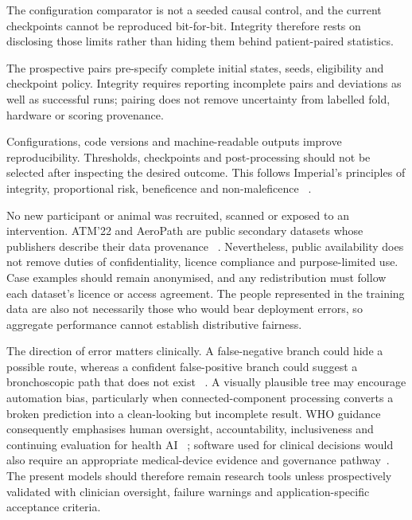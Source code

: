 \ifshowcurrentcontrol
\begin{currentcontrolroute}
The configuration comparator is not a seeded causal control, and the current checkpoints cannot
be reproduced bit-for-bit. Integrity therefore rests on disclosing those limits rather than
hiding them behind patient-paired statistics.
\end{currentcontrolroute}
\fi

\ifshowpairedcontrol
\begin{pairedcontrolroute}
The prospective pairs pre-specify complete initial states, seeds, eligibility and checkpoint
policy. Integrity requires reporting incomplete pairs and deviations as well as successful runs;
pairing does not remove uncertainty from labelled fold, hardware or scoring provenance.
\end{pairedcontrolroute}
\fi

Configurations, code versions and machine-readable outputs improve reproducibility. Thresholds,
checkpoints and post-processing should not be selected after inspecting the desired outcome. This
follows Imperial's principles of integrity, proportional risk, beneficence and non-maleficence
~\cite{imperial2025ethicalframework}.

No new participant or animal was recruited, scanned or exposed to an intervention. ATM'22 and
AeroPath are public secondary datasets whose publishers describe their data provenance
~\cite{zhang2023atm22,stoverud2023aeropath}. Nevertheless, public availability does not remove
duties of confidentiality, licence compliance and purpose-limited use. Case examples should
remain anonymised, and any redistribution must follow each dataset's licence or access agreement.
The people represented in the training data are also not necessarily those who would bear deployment errors, so aggregate
performance cannot establish distributive fairness.

The direction of error matters clinically. A false-negative branch could hide a possible route,
whereas a confident false-positive branch could suggest a bronchoscopic path that does not exist
~\cite{Dhillon2017PeripheralBronchoscopy,HammadAltaq2023robotic}. A visually plausible tree may
encourage automation bias, particularly when connected-component processing converts a broken
prediction into a clean-looking but incomplete result. WHO guidance consequently emphasises
human oversight, accountability, inclusiveness and continuing evaluation for health AI
~\cite{who2021aiguidance}; software used for clinical decisions would also require an appropriate
medical-device evidence and governance pathway~\cite{mhra2025aimd}. The present models should
therefore remain research tools unless prospectively validated with clinician oversight,
failure warnings and application-specific acceptance criteria.

